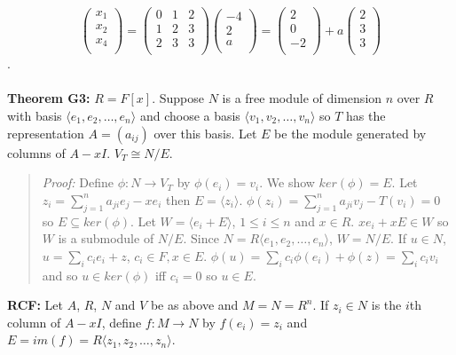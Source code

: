 $$
\left(
\begin{array}{c}
x_1\\
x_2\\
x_4\\
\end{array}
\right)
=
\left(
\begin{array}{ccc}
0 & 1 & 2\\
1 & 2& 3\\
2 & 3& 3\\
\end{array}
\right)
\left(
\begin{array}{c}
-4\\
2\\
a\\
\end{array}
\right) =
\left(
\begin{array}{c}
2\\
0\\
-2\\
\end{array}
\right) + a
\left(
\begin{array}{c}
2\\
3\\
3\\
\end{array}
\right)
$$.
\\
\\
{\bf Theorem G3:} $R=F[x]$.  Suppose $N$ is a free module of dimension $n$ over $R$ 
with basis $\langle e_1 , e_2 , \ldots , e_n \rangle$ and choose a
basis $\langle v_1 , v_2 , \ldots , v_n \rangle$ so $T$ has the representation $A= (a_{ij})$
over this basis.  Let $E$ be the module generated by columns of $A-xI$.  $V_T \cong N/E$.
\begin{quote}
\emph{Proof:} 
Define $\phi: N \rightarrow V_T$ by $\phi(e_i)=v_i$.  
We show $ker(\phi)=E$. 
Let $z_i = \sum_{j=1}^n a_{ji}e_j - xe_i$ then $E= \langle z_i \rangle$.
$\phi(z_i) = \sum_{j=1}^n a_{ji}v_j - T(v_i)= 0$ so $E \subseteq ker(\phi)$.
Let $W = \langle e_i + E \rangle$, $1 \leq i \leq n$ and $x \in R$.
$x e_i + xE \in W$ so $W$ is a submodule of $N/E$.
Since $N= R \langle e_1 , e_2 , \ldots , e_n \rangle$, $W= N/E$.
If $u \in N$, $u = \sum_i c_i e_i + z$, $c_i \in F, x \in E$.
$\phi(u)=  \sum_i c_i \phi(e_i) + \phi(z) = \sum_i c_i v_i$ and so $u \in ker(\phi)$ iff $c_i =0$ so $u \in E$.
\end{quote}
{\bf RCF:} Let $A$, $R$, $N$ and $V$ be as above and $M = N = R^n$.  If $z_i \in N$ is the $i$th column
of $A-xI$, define $f: M \rightarrow N$ by $f(e_i)= z_i$ and $E= im(f) = R \langle z_1, z_2, \ldots , z_n \rangle$.

